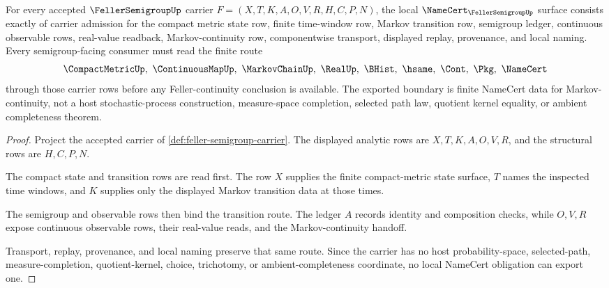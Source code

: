 \begin{theorem}
\label{thm:feller-semigroup-namecert-obligations}
For every accepted $\FellerSemigroupUp$ carrier $F=(X,T,K,A,O,V,R,H,C,P,N)$, the local $\NameCert_{\FellerSemigroupUp}$ surface consists exactly of carrier admission for the compact metric state row, finite time-window row, Markov transition row, semigroup ledger, continuous observable rows, real-value readback, Markov-continuity row, componentwise transport, displayed replay, provenance, and local naming. Every semigroup-facing consumer must read the finite route
$$
\CompactMetricUp,\ \ContinuousMapUp,\ \MarkovChainUp,\ \RealUp,\ \BHist,\ \hsame,\ \Cont,\ \Pkg,\ \NameCert
$$
through those carrier rows before any Feller-continuity conclusion is available. The exported boundary is finite NameCert data for Markov-continuity, not a host stochastic-process construction, measure-space completion, selected path law, quotient kernel equality, or ambient completeness theorem.
\end{theorem}
\begin{proof}
Project the accepted carrier of \autoref{def:feller-semigroup-carrier}. The displayed analytic rows are $X,T,K,A,O,V,R$, and the structural rows are $H,C,P,N$.

The compact state and transition rows are read first. The row $X$ supplies the finite compact-metric state surface, $T$ names the inspected time windows, and $K$ supplies only the displayed Markov transition data at those times.

The semigroup and observable rows then bind the transition route. The ledger $A$ records identity and composition checks, while $O,V,R$ expose continuous observable rows, their real-value reads, and the Markov-continuity handoff.

Transport, replay, provenance, and local naming preserve that same route. Since the carrier has no host probability-space, selected-path, measure-completion, quotient-kernel, choice, trichotomy, or ambient-completeness coordinate, no local NameCert obligation can export one.
\end{proof}

